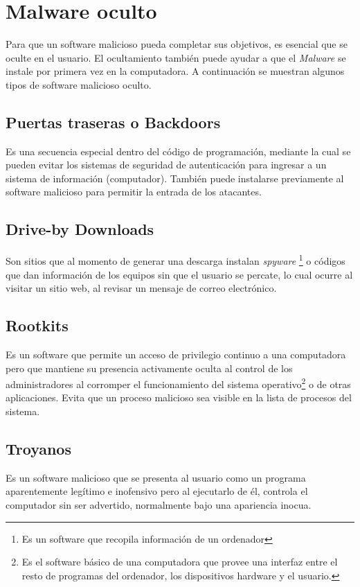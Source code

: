 \section{Malware oculto}
Para que un software malicioso pueda completar sus objetivos, es esencial que se oculte en el usuario. El ocultamiento también puede ayudar a que el \textit{Malware} se instale por primera vez en la computadora. A continuación se muestran algunos tipos de software malicioso oculto.

\subsection{Puertas traseras o Backdoors}
Es una secuencia especial dentro del código de programación, mediante la cual se pueden evitar los sistemas de seguridad de autenticación para ingresar a un sistema de información (computador). También puede instalarse previamente al software malicioso para permitir la entrada de los atacantes.

\subsection{Drive-by Downloads}
Son sitios que al momento de generar una descarga instalan \textit{spyware} \footnote{Es un software que recopila información de un ordenador} o códigos que dan información de los equipos sin que el usuario se percate, lo cual ocurre al visitar un sitio web, al revisar un mensaje de correo electrónico.

\subsection{Rootkits}
Es un software que permite un acceso de privilegio continuo a una computadora pero que mantiene su presencia activamente oculta al control de los administradores al corromper el funcionamiento del sistema operativo\footnote{Es el software básico de una computadora que provee una interfaz entre el resto de programas del ordenador, los dispositivos hardware y el usuario.} o de otras aplicaciones. Evita que un proceso malicioso sea visible en la lista de procesos del sistema.

\subsection{Troyanos}
Es un software malicioso que se presenta al usuario como un programa aparentemente legítimo e inofensivo pero al ejecutarlo de él, controla el computador sin ser advertido, normalmente bajo una apariencia inocua.

